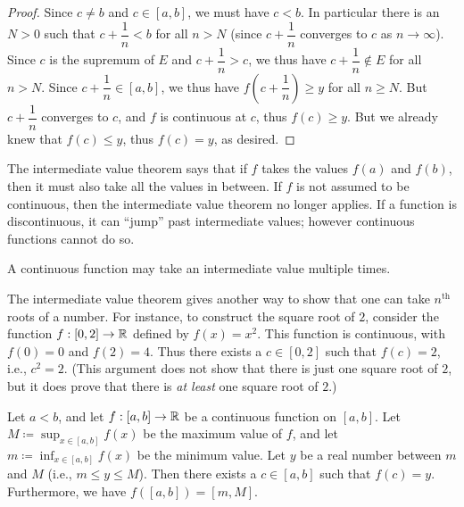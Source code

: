 \begin{proof}
  Since \(c \neq b\) and \(c \in [a, b]\), we must have \(c < b\).
  In particular there is an \(N > 0\) such that \(c + \dfrac{1}{n} < b\) for all \(n > N\)
  (since \(c + \dfrac{1}{n}\) converges to \(c\) as \(n \to \infty\)).
  Since \(c\) is the supremum of \(E\) and \(c + \dfrac{1}{n} > c\), we thus have \(c + \dfrac{1}{n} \notin E\) for all \(n > N\).
  Since \(c + \dfrac{1}{n} \in [a, b]\), we thus have \(f(c + \dfrac{1}{n}) \geq y\) for all \(n \geq N\).
  But \(c + \dfrac{1}{n}\) converges to \(c\), and \(f\) is continuous at \(c\), thus \(f(c) \geq y\).
  But we already knew that \(f(c) \leq y\), thus \(f(c) = y\), as desired.
\end{proof}

\begin{note}
  The intermediate value theorem says that if \(f\) takes the values \(f(a)\) and \(f(b)\), then it must also take all the values in between.
  If \(f\) is not assumed to be continuous, then the intermediate value theorem no longer applies.
  If a function is discontinuous, it can ``jump'' past intermediate values;
  however continuous functions cannot do so.
\end{note}

\begin{rmk}\label{9.7.2}
  A continuous function may take an intermediate value multiple times.
\end{rmk}

\begin{rmk}\label{9.7.3}
  The intermediate value theorem gives another way to show that one can take \(n^{\text{th}}\) roots of a number.
  For instance, to construct the square root of \(2\), consider the function \(f : [0, 2] \to \mathbb{R}\) defined by \(f(x) = x^2\).
  This function is continuous, with \(f(0) = 0\) and \(f(2) = 4\).
  Thus there exists a \(c \in [0, 2]\) such that \(f(c) = 2\), i.e., \(c^2 = 2\).
  (This argument does not show that there is just one square root of \(2\), but it does prove that there is \emph{at least} one square root of \(2\).)
\end{rmk}

\begin{cor}\label{9.7.4}
  Let \(a < b\), and let \(f : [a, b] \to \mathbb{R}\) be a continuous function on \([a, b]\).
  Let \(M \coloneqq \sup_{x \in [a, b]} f(x)\) be the maximum value of \(f\), and let \(m \coloneqq \inf_{x \in [a, b]} f(x)\) be the minimum value.
  Let \(y\) be a real number between \(m\) and \(M\) (i.e., \(m \leq y \leq M\)).
  Then there exists a \(c \in [a, b]\) such that \(f(c) = y\).
  Furthermore, we have \(f([a, b]) = [m, M]\).
\end{cor}


